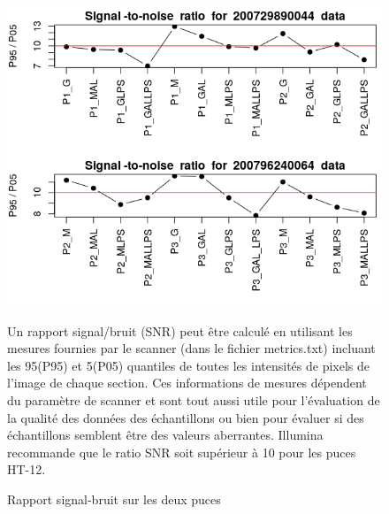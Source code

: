 \documentclass[a4paper,10pt]{article}
\begin{document}
\begin{figure}
 \centering
 \includegraphics[scale=0.5]{../../R/output/signal_to_noise.png}
 \caption{Rapport signal-bruit sur les deux puces}
 Un rapport signal/bruit (SNR) peut être calculé en utilisant les mesures fournies par le scanner (dans le fichier metrics.txt) incluant les 95(P95) et 5(P05) quantiles de toutes les intensités de pixels de  l’image de chaque section. 
 Ces informations de mesures dépendent du paramètre de scanner et sont tout aussi utile pour l’évaluation de la qualité des données des échantillons ou bien pour évaluer si des échantillons semblent être des valeurs aberrantes. 
 Illumina recommande que le ratio SNR soit supérieur à 10 pour les puces HT-12.
 \label{fig:SNR}
\end{figure}
\end{document}
